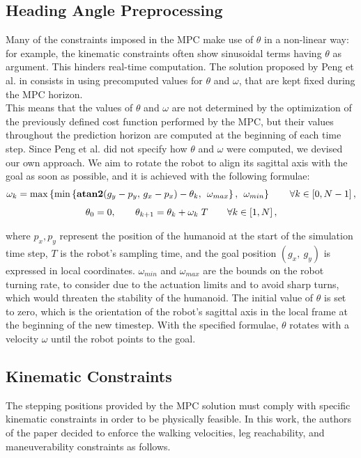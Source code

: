 \subsection{Heading Angle Preprocessing}
Many of the constraints imposed in the MPC make use of $\theta$ in a non-linear way: for example, the kinematic constraints often show sinusoidal terms having $\theta$ as argument. This hinders real-time computation. The solution proposed by Peng et al. in \cite{peng_main_paper} consists in using precomputed values for $\theta$ and $\omega$, that are kept fixed during the MPC horizon.\\
This means that the values of $\theta$ and $\omega$ are not determined by the optimization of the previously defined cost function performed by the MPC, but their values throughout the prediction horizon are computed at the beginning of each time step. Since Peng et al. did not specify how $\theta$ and $\omega$ were computed, we devised our own approach. We aim to rotate the robot to align its sagittal axis with the goal as soon as possible, and it is achieved with the following formulae:
\begin{gather}
\omega_k = \max \left\{ \min \left\{ \operatorname{\textbf{atan2}}(g_y - p_y,\, g_x - p_x) - \theta_k,\, \; \omega_{max} \right\} ,\, \; \omega_{min} \right\} \qquad \forall k \in \left[0, N-1 \right], \notag \\[1ex]
\theta_0 = 0, \qquad \theta_{k+1} = \theta_{k} + \omega_k\;T \qquad \forall k \in \left[1, N\right], \notag
\end{gather}

where $p_x, p_y$ represent the position of the humanoid at the start of the simulation time step, $T$ is the robot's sampling time, and the goal position $(g_x, \ g_y)$ is expressed in local coordinates. $\omega_{min}$ and $\omega_{max}$ are the bounds on the robot turning rate, to consider due to the actuation limits and to avoid sharp turns, which would threaten the stability of the humanoid. The initial value of $\theta$ is set to zero, which is the orientation of the robot's sagittal axis in the local frame at the beginning of the new timestep. With the specified formulae, $\theta$ rotates with a velocity $\omega$ until the robot points to the goal.

\subsection{Kinematic Constraints}
The stepping positions provided by the MPC solution must comply with specific kinematic constraints in order to be physically feasible. In this work, the authors of the paper decided to enforce the walking velocities, leg reachability, and maneuverability constraints as follows.

